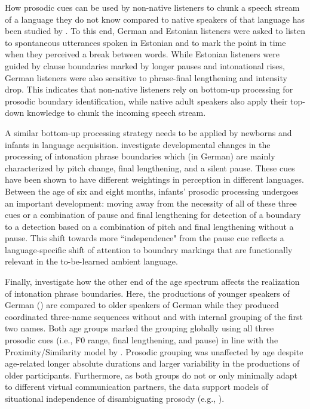 \begin{refsection}
How prosodic cues can be used by non-native listeners to chunk a speech stream of a language they do not know compared to native speakers of that language has been studied by . To this end, German and Estonian listeners were asked to listen to spontaneous utterances spoken in Estonian and to mark the point in time when they perceived a break between words. While Estonian listeners were guided by clause boundaries marked by longer pauses and intonational rises, German listeners were also sensitive to phrase-final lengthening and intensity drop. This indicates that non-native listeners rely on bottom-up processing for prosodic boundary identification, while native adult speakers also apply their top-down knowledge to chunk the incoming speech stream.

A similar bottom-up processing strategy needs to be applied by newborns and infants in language acquisition.  investigate developmental changes in the processing of intonation phrase boundaries which (in German) are mainly characterized by pitch change, final lengthening, and a silent pause. These cues have been shown to have different weightings in perception in different languages. Between the age of six and eight months, infants’ prosodic processing undergoes an important development: moving away from the necessity of all of these three cues or a combination of pause and final lengthening for detection of a boundary to a detection based on a combination of pitch and final lengthening without a pause. This shift towards more ``independence" from the pause cue reflects a language-specific shift of attention to boundary markings that are functionally relevant in the to-be-learned ambient language. 

Finally,  investigate how the other end of the age spectrum affects the realization of intonation phrase boundaries. Here, the productions of younger speakers of German (\cite{huttenlauchetal2021}) are compared to older speakers of German while they produced coordinated three-name sequences without and with internal grouping of the first two names. Both age groups marked the grouping globally using all three prosodic cues (i.e., F0 range, final lengthening, and pause) in line with the Proximity/Similarity model by \citet{kentner_new_2013}. Prosodic grouping was unaffected by age despite age-related longer absolute durations and larger variability in the productions of older participants. Furthermore, as both groups do not or only minimally adapt to different virtual communication partners, the data support models of situational independence of disambiguating prosody (e.g., \cite{speer_situationally_2011}).


\end{refsection}
